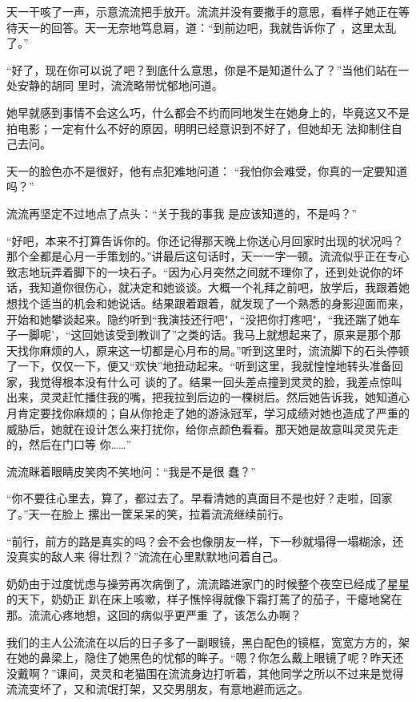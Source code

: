 \documentclass{article}
\begin{document}
天一干咳了一声，示意流流把手放开。流流并没有要撒手的意思，看样子她正在等待天一的回答。天一无奈地笃息肩，道：“到前边吧，我就告诉你了
，这里太乱了。” 

“好了，现在你可以说了吧？到底什么意思，你是不是知道什么了？”当他们站在一处安静的胡同
里时，流流略带忧郁地问道。 

她早就感到事情不会这么巧，什么都会不约而同地发生在她身上的，毕竟这又不是拍电影；一定有什么不好的原因，明明已经意识到不好了，但她却无
法抑制住自己去问。 

\newpage

天一的脸色亦不是很好，他有点犯难地问道：
“我怕你会难受，你真的一定要知道吗？” 

流流再坚定不过地点了点头：“关于我的事我
是应该知道的，不是吗？” 

“好吧，本来不打算告诉你的。你还记得那天晚上你送心月回家时出现的状况吗？那个全都是心月一手策划的。”讲最后这句话时，天一一字一顿。流流似乎正在专心致志地玩弄着脚下的一块石子。“因为心月突然之间就不理你了，还到处说你的坏话，我知道你很伤心，就决定和她谈谈。大概一个礼拜之前吧，放学后，我跟着她想找个适当的机会和她说话。结果跟着跟着，就发现了一个熟悉的身影迎面而来，开始和她攀谈起来。隐约听到“我演技还行吧"，“没把你打疼吧"，“我还踹了她车子一脚呢'，“这回她该受到教训了”之类的话。我马上就想起来了，原来是那个那天找你麻烦的人，原来这一切都是心月布的局。”听到这里时，流流脚下的石头停顿了一下，仅仅一下，便又“欢快”地扭动起来。“听到这里，我就惶惶地转头准备回家，我觉得根本没有什么可
\newpage
谈的了。结果一回头差点撞到灵灵的脸，我差点惊叫出来，灵灵赶忙播住我的嘴，把我拉到后边的一棵树后。然后她告诉我，她知道心月肯定要找你麻烦的；自从你抢走了她的游泳冠军，学习成绩对她也造成了严重的威胁后，她就在设计怎么来打扰你，给你点颜色看看。那天她是故意叫灵灵先走的，然后在门口等
你……” 

流流眯着眼睛皮笑肉不笑地问：“我是不是很
蠢？” 

“你不要往心里去，算了，都过去了。早看清她的真面目不是也好？走啦，回家了。”天一在脸上
摞出一筐呆呆的笑，拉着流流继续前行。 

“前行，前方的路是真实的吗？会不会也像朋友一样，下一秒就塌得一塌糊涂，还没真实的敌人来
得壮烈？”流流在心里默默地问着自己。 

奶奶由于过度忧虑与操劳再次病倒了，流流踏进家门的时候整个夜空已经成了星星的天下，奶奶正
\newpage
趴在床上咳嗽，样子憔悴得就像下霜打蔫了的茄子，干瘪地窝在那。流流心疼地想，这回的病似乎更严重
了，该怎么办啊？ 

我们的主人公流流在以后的日子多了一副眼镜，黑白配色的镜框，宽宽方方的，架在她的鼻梁上，隐住了她黑色的忧郁的眸子。“嗯？你怎么戴上眼镜了呢？昨天还没戴啊？”课间，灵灵和老猫围在流流身边打听着，其他同学之所以不过来是觉得流流变坏了，又和流氓打架，又交男朋友，有意地避而远之。
\end{document}
